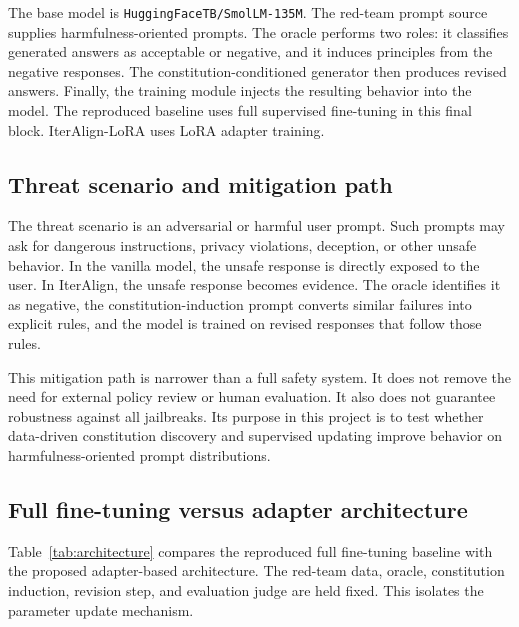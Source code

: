 \documentclass[10pt,twocolumn]{article}
\newcommand{\method}{IterAlign-LoRA}
\begin{document}
The base model is \texttt{HuggingFaceTB/SmolLM-135M}. The red-team prompt source supplies harmfulness-oriented prompts. The oracle performs two roles: it classifies generated answers as acceptable or negative, and it induces principles from the negative responses. The constitution-conditioned generator then produces revised answers. Finally, the training module injects the resulting behavior into the model. The reproduced baseline uses full supervised fine-tuning in this final block. \method{} uses LoRA adapter training.

\subsection{Threat scenario and mitigation path}
The threat scenario is an adversarial or harmful user prompt. Such prompts may ask for dangerous instructions, privacy violations, deception, or other unsafe behavior. In the vanilla model, the unsafe response is directly exposed to the user. In IterAlign, the unsafe response becomes evidence. The oracle identifies it as negative, the constitution-induction prompt converts similar failures into explicit rules, and the model is trained on revised responses that follow those rules.

This mitigation path is narrower than a full safety system. It does not remove the need for external policy review or human evaluation. It also does not guarantee robustness against all jailbreaks. Its purpose in this project is to test whether data-driven constitution discovery and supervised updating improve behavior on harmfulness-oriented prompt distributions.

\subsection{Full fine-tuning versus adapter architecture}
Table~\ref{tab:architecture} compares the reproduced full fine-tuning baseline with the proposed adapter-based architecture. The red-team data, oracle, constitution induction, revision step, and evaluation judge are held fixed. This isolates the parameter update mechanism.
\end{document}
